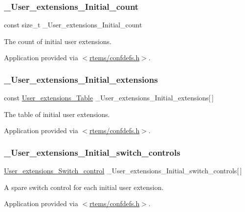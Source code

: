 \subsubsection{\texorpdfstring{\_User\_extensions\_Initial\_count}{\_User\_extensions\_Initial\_count}}
{\footnotesize\ttfamily const size\+\_\+t \+\_\+\+User\+\_\+extensions\+\_\+\+Initial\+\_\+count}



The count of initial user extensions. 

Application provided via $<$\mbox{\hyperlink{confdefs_8h}{rtems/confdefs.\+h}}$>$. \mbox{\label{group__RTEMSScoreUserExt_gafe277338e657c6fd563384012bc0e23c}} 
\subsubsection{\texorpdfstring{\_User\_extensions\_Initial\_extensions}{\_User\_extensions\_Initial\_extensions}}
{\footnotesize\ttfamily const \mbox{\hyperlink{structUser__extensions__Table}{User\+\_\+extensions\+\_\+\+Table}} \+\_\+\+User\+\_\+extensions\+\_\+\+Initial\+\_\+extensions\mbox{[}$\,$\mbox{]}}



The table of initial user extensions. 

Application provided via $<$\mbox{\hyperlink{confdefs_8h}{rtems/confdefs.\+h}}$>$. \mbox{\label{group__RTEMSScoreUserExt_ga8a3af974c302d7af8bca9ecf85ac8149}} 
\subsubsection{\texorpdfstring{\_User\_extensions\_Initial\_switch\_controls}{\_User\_extensions\_Initial\_switch\_controls}}
{\footnotesize\ttfamily \mbox{\hyperlink{structUser__extensions__Switch__control}{User\+\_\+extensions\+\_\+\+Switch\+\_\+control}} \+\_\+\+User\+\_\+extensions\+\_\+\+Initial\+\_\+switch\+\_\+controls\mbox{[}$\,$\mbox{]}}



A spare switch control for each initial user extension. 

Application provided via $<$\mbox{\hyperlink{confdefs_8h}{rtems/confdefs.\+h}}$>$. 